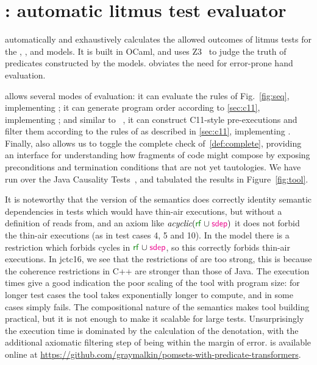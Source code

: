 \section{\PwTerTITLE: automatic litmus test evaluator}
\label{sec:tool}

\PwTer{} automatically and exhaustively calculates the allowed outcomes of litmus tests for the \PwT, \PwTpo, and \PwTc{} models. It is built in OCaml, and uses Z3~\cite{Z3Solver} to judge the truth of predicates constructed by the models. \PwTer{} obviates the need for error-prone hand evaluation.

\PwTer{} allows several modes of evaluation: it can evaluate the rules of Fig.~\ref{fig:seq}, implementing \PwT; it can generate program order according to \textsection\ref{sec:c11}, implementing \PwTpo; and similar to \MRD~\cite{DBLP:conf/esop/PaviottiCPWOB20}, it can construct C11-style pre-executions and filter them according to the rules of \rcXI{} as described in \textsection\ref{sec:c11}, implementing \PwTc{}.
Finally, \PwTer{} also allows us to toggle the complete check of~\ref{def:complete}, providing an interface for understanding how fragments of code might compose by exposing preconditions and termination conditions that are not yet tautologies.
We have run \PwTer{} over the Java Causality Tests~\cite{PughWebsite}, and tabulated the results in Figure~\ref{fig:tool}.

It is noteworthy that the \PwTc{} version of the semantics does correctly identity semantic dependencies in tests which would have thin-air executions, but without a definition of reads from, and an axiom like $\textit{acyclic}(\rrfx \cup \rsdepx)$ it does not forbid the thin-air executions (as in test cases 4, 5 and 10).
In the \PwTc{} model there is a restriction which forbids cycles in $\rrfx \cup \rsdepx$, so this correctly forbids thin-air executions.
In jctc16, we see that the restrictions of \PwTc{} are too strong, this is because the coherence restrictions in C++ are stronger than those of Java.
The execution times give a good indication the poor scaling of the tool with program size: for longer test cases the tool takes exponentially longer to compute, and in some cases simply fails.
The compositional nature of the semantics makes tool building practical, but it is not enough to make it scalable for large tests.
Unsurprisingly the execution time is dominated by the calculation of the denotation, with the additional axiomatic filtering step of \PwTc{} being within the margin of error. 
\PwTer{} is available online at \url{https://github.com/graymalkin/pomsets-with-predicate-transformers}.

